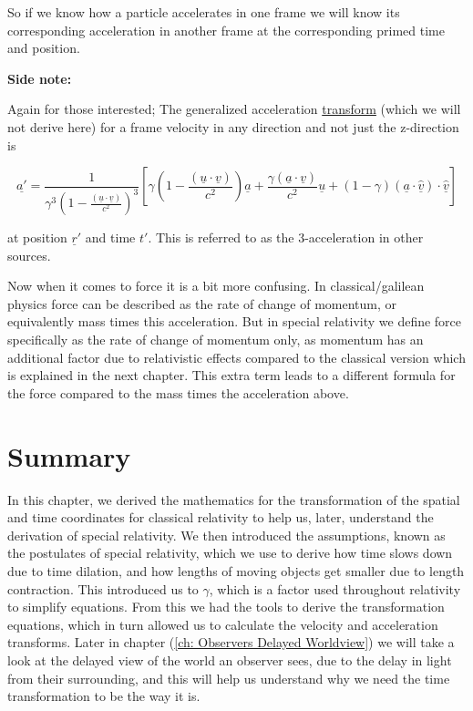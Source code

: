 So if we know how a particle accelerates in one frame we will know its corresponding acceleration in another frame at the corresponding primed time and position.

\textbf{Side note:}

Again for those interested; The generalized acceleration \hyperlink{def-transform}{transform} (which we will not derive here) for a frame velocity in any direction and not just the z-direction is

\begin{equation}
	\underline{a{'}} = \frac{1}{{\gamma} ^3 \left(1-\frac{(\underline{u}\cdot \underline{v})}{{c}^2}\right)^3}\left[ {\gamma} \left(1-\frac{(\underline{u}\cdot\underline{v})}{{c}^2}\right)\underline{a} + \frac{{\gamma} (\underline{a}\cdot\underline{v})}{{c}^2}\underline{u} + (1-{\gamma} ) (\underline{a}\cdot\hat{\underline{v}}) \cdot\hat{\underline{v}}\right]
\end{equation}

at position ${\underline{r}{'}}$ and time ${t{'}}$.
This is referred to as the 3-acceleration in other sources.

Now when it comes to force it is a bit more confusing.
In classical/galilean physics force can be described as the rate of change of momentum, or equivalently mass times this acceleration.
But in special relativity we define force specifically as the rate of change of momentum only, as momentum has an additional factor due to relativistic effects compared to the classical version which is explained in the next chapter.
This extra term leads to a different formula for the force compared to the mass times the acceleration above.


\section{Summary}\label{sect: Summary chapter 2}

In this chapter, we derived the mathematics for the transformation of the spatial and time coordinates for classical relativity to help us, later, understand the derivation of special relativity.
We then introduced the assumptions, known as the postulates of special relativity, which we use to derive how time slows down due to time dilation, and how lengths of moving objects get smaller due to length contraction.
This introduced us to $\gamma$, which is a factor used throughout relativity to simplify equations.
From this we had the tools to derive the transformation equations, which in turn allowed us to calculate the velocity and acceleration transforms.
Later in chapter (\ref{ch: Observers Delayed Worldview}) we will take a look at the delayed view of the world an observer sees, due to the delay in light from their surrounding, and this will help us understand why we need the time transformation to be the way it is.

